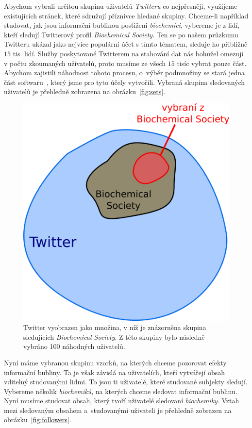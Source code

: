 \documentclass[12pt, a4paper]{article}
\numberwithin{equation}{section} 	%
\begin{document}
Abychom vybrali určitou skupinu uživatelů \textit{Twitteru} co nejpřesněji, využijeme existujících stránek, které sdružují příznivce hledané skupiny. Chceme-li například studovat, jak jsou informační bublinou postiženi \textit{biochemici}, vybereme je z lidí, kteří sledují Twitterový profil \textit{Biochemical Society}. Ten se po našem průzkumu Twitteru ukázal jako nejvíce populární účet s tímto tématem, sleduje ho přibližně $15$ tis. lidí. Služby poskytované Twitterem na stahování dat nás bohužel omezují v počtu zkoumaných uživatelů, proto musíme ze všech $15$ tisíc vybrat pouze část. Abychom zajistili náhodnost tohoto procesu, o~výběr podmnožiny se stará jedna část softwaru~\cite{myRepo}, který jsme pro tyto účely vytvořili. Vybraná skupina sledovaných uživatelů je přehledně zobrazena na obrázku~\autoref{fig:sets}.
\begin{figure}[h]\centering
\includegraphics[scale=0.27]{./Pics/sets.png}
    \caption{Twitter vyobrazen jako množina, v níž je znázorněna skupina sledujících \textit{Biochemical Society}. Z této skupiny bylo následně vybráno 100 náhodných uživatelů.}
\label{fig:sets}
\end{figure}
Nyní máme vybranou skupinu vzorků, na kterých chceme pozorovat efekty informační bubliny. Ta je však závislá na uživatelích, kteří vytvářejí obsah vditelný studovanými lidmi. To jsou ti uživatelé, které studované subjekty sledují. Vybereme několik \textit{biochemiků}, na kterých chceme sledovat informační bublinu. Nyní musíme studovat obsah, který tvoří uživatelé sledovaní \textit{biochemiky}. Vztah mezi sledovaným obsahem a~studovanými uživateli je přehledně zobrazen na obrázku~\autoref{fig:followers}.
\end{document}
